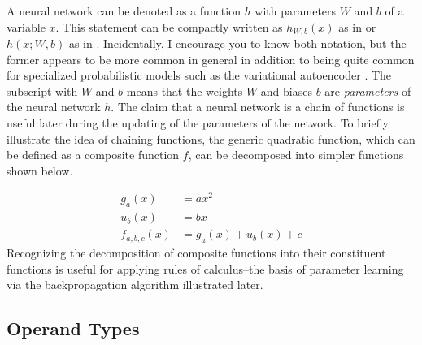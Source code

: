 \documentclass{article}
\begin{document}
A neural network can be denoted as a function $h$ with parameters $W$
and $b$ of a variable $x$. This statement can be compactly written as
$h_{W, b}(x)$ as in \cite{Geron2020} or $h(x; W, b)$ as in \cite{Goodfellow2016}.
Incidentally, I encourage you to know both notation, but the former appears to be more common
in general in addition to being quite common for specialized
probabilistic models such as the variational autoencoder \cite{Kingma2014}.
The subscript with $W$ and $b$ means that the weights $W$ and biases $b$ are
\textit{parameters } of the neural network $h$.
The claim that a neural network is a chain of functions is useful later during
the updating of the parameters of the network. To briefly illustrate the idea
of chaining functions, the generic quadratic function, which can be defined
as a composite function $f$, can be decomposed into simpler functions shown
below.

\begin{align}
	g_{a}(x)     & = ax^{2}                  \\
	u_{b}(x)     & = bx                      \\
	f_{a,b,c}(x) & = g_{a}(x) + u_{b}(x) + c
\end{align}
Recognizing the decomposition of composite functions into their constituent
functions is useful for applying rules of calculus--the basis of parameter learning via
the backpropagation algorithm illustrated later.

\subsection{Operand Types}
\end{document}
